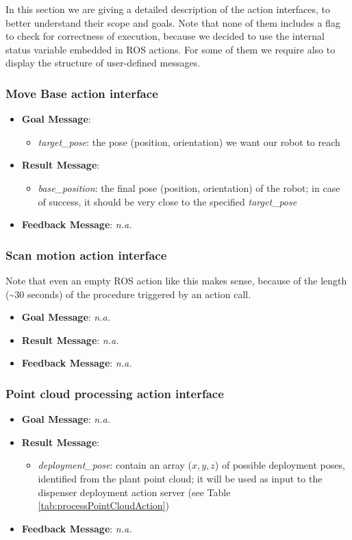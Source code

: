 In this section we are giving a detailed description of the action interfaces, to better understand their scope and goals. Note that none of them includes a flag to check for correctness of execution, because we decided to use the internal status variable embedded in \ac{ROS} actions. For some of them we require also to display the structure of user-defined messages.

\subsubsection{Move Base action interface}
\begin{itemize}
	\item \textbf{Goal Message}:
		\begin{itemize}
			\item \textit{target\_pose}: the pose (position, orientation) we want our robot to reach
		\end{itemize} 
	\item  \textbf{Result Message}:
		\begin{itemize}
			\item \textit{base\_position}: the final pose (position, orientation) of the robot; in case of success, it should be very close to the specified \textit{target\_pose}
		\end{itemize} 
	\item  \textbf{Feedback Message}: \textit{n.a.}
\end{itemize}

\subsubsection{Scan motion action interface}
Note that even an empty \ac{ROS} action like this makes sense, because of the length (\textasciitilde30 seconds) of the procedure triggered by an action call.
\begin{itemize}
	\item \textbf{Goal Message}: \textit{n.a.}
	\item  \textbf{Result Message}: \textit{n.a.}
	\item  \textbf{Feedback Message}: \textit{n.a.}
\end{itemize}

\subsubsection{Point cloud processing action interface}
\begin{itemize}
	\item \textbf{Goal Message}: \textit{n.a.}
	\item  \textbf{Result Message}: 
		\begin{itemize}
			\item \textit{deployment\_pose}: contain an array ($x,y,z$) of possible deployment poses, identified from the plant point cloud; it will be used as input to the dispenser deployment action server (see Table \ref{tab:processPointCloudAction})
		\end{itemize}
	\item  \textbf{Feedback Message}: \textit{n.a.}
\end{itemize}

